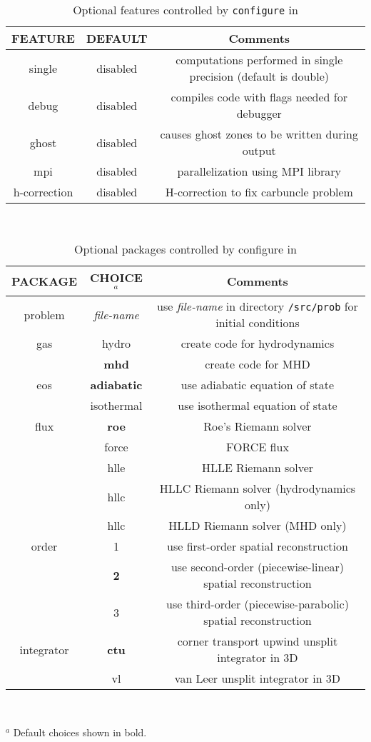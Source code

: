 \begin{table}[ht]
\caption{Optional features controlled by {\tt configure} in \ath}
\begin{center}
\begin{tabular}{|c|c|c|} \hline \hline
FEATURE & DEFAULT & Comments \\ \hline
single &  disabled & computations performed in single precision (default is double) \\
debug  & disabled & compiles code with flags needed for debugger \\
ghost  & disabled & causes ghost zones to be written during output \\
mpi    & disabled & parallelization using MPI library \\
h-correction & disabled & H-correction to fix carbuncle problem 
\\ \hline
\end{tabular}
\end{center}
\\
\end{table}

\begin{table}[ht]
\caption{Optional packages controlled by configure in \ath}
\begin{center}
\begin{tabular}{|c|c|c|} \hline \hline
PACKAGE & CHOICE$^{a}$ & Comments \\ \hline
problem & {\it file-name} & use {\it file-name} in directory {\tt /src/prob} for initial conditions \\ \hline
gas    & hydro  & create code for hydrodynamics \\
       & {\bf mhd}    & create code for MHD \\ \hline
eos    & {\bf adiabatic} & use adiabatic equation of state \\
       & isothermal & use isothermal equation of state \\ \hline
flux & {\bf roe} & Roe's Riemann solver \\
     & force & FORCE flux \\
     & hlle & HLLE Riemann solver \\
     & hllc & HLLC Riemann solver (hydrodynamics only) \\
     & hllc & HLLD Riemann solver (MHD only) \\ \hline
order & 1 & use first-order spatial reconstruction \\
      & {\bf 2} & use second-order (piecewise-linear) spatial reconstruction \\
      & 3 & use third-order (piecewise-parabolic) spatial reconstruction \\ \hline
integrator & {\bf ctu} & corner transport upwind unsplit integrator in 3D \\
           & vl & van Leer unsplit integrator in 3D \\
\hline
\end{tabular} \\
\end{center}
$^{a}$ Default choices shown in bold.
\end{table}

